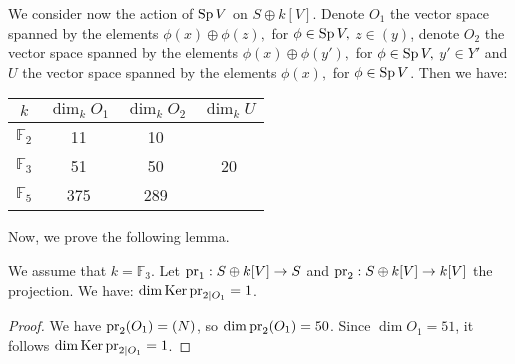We consider now the action of $\operatorname{Sp} V$ on $S\oplus k[V]$. 
Denote $O_1$ the vector space spanned by the elements $\phi(x)\oplus \phi(z),$ for $\phi \in \operatorname{Sp} V,$ $z \in (y)$,
denote $O_2$ the vector space spanned by the elements $\phi(x)\oplus \phi(y'),$ for $\phi \in \operatorname{Sp} V,$ $y' \in Y'$
and $U$ the vector space spanned by the elements $\phi(x),$ for $\phi \in \operatorname{Sp} V$.
Then we have:
\vspace{2mm}
\begin{center}
\begin{tabular}{c||c|c|c}
 $k$ & $\dim_k O_1$ & $\dim_k O_2 $  & $\dim_k U$\\
\hline
$\mathbb F_2$ & 11 & 10 &  \\
$\mathbb F_3$ & 51 & 50 & 20 \\
$\mathbb F_5$ & 375 & 289 & 
\end{tabular}
\end{center}
Now, we prove the following lemma.
\begin{lemme}\label{cleffinclassesdiv}
We assume that $k=\mathbb F_3$. Let $\operatorname{pr}_1: S\oplus k[V]\rightarrow S$ and $\operatorname{pr}_2: S\oplus k[V]\rightarrow k[V]$ the projection. 
We have: 
$\dim \operatorname{Ker}\operatorname{pr}_{2|O_1}=1$.
\end{lemme}
\begin{proof}
We have $\operatorname{pr}_{2}(O_1)=(N)$, so $\dim \operatorname{pr}_{2}(O_1)=50$.
Since $\dim O_1=51$, it follows $\dim \operatorname{Ker}\operatorname{pr}_{2|O_1}=1$. 
\end{proof}